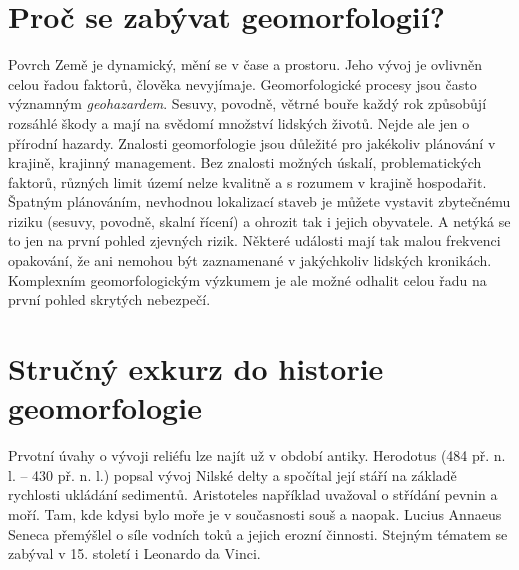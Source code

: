 \section{Proč se zabývat geomorfologií?}
Povrch Země je dynamický, mění se v čase a prostoru. Jeho vývoj je ovlivněn celou řadou faktorů, člověka nevyjímaje. Geomorfologické procesy jsou často významným \emph{geohazardem}. Sesuvy, povodně, větrné bouře každý rok způsobůjí rozsáhlé škody a mají na svědomí množství lidských životů. Nejde ale jen o přírodní hazardy. Znalosti geomorfologie jsou důležité pro jakékoliv plánování v krajině, krajinný management. Bez znalosti možných úskalí, problematických faktorů, různých limit území nelze kvalitně a s rozumem v krajině hospodařit. Špatným plánováním, nevhodnou lokalizací staveb je můžete vystavit zbytečnému riziku (sesuvy, povodně, skalní řícení) a ohrozit tak i jejich obyvatele. 
A netýká se to jen na první pohled zjevných rizik. Některé události mají tak malou frekvenci opakování, že ani nemohou být zaznamenané v jakýchkoliv lidských kronikách. Komplexním geomorfologickým výzkumem je ale možné odhalit celou řadu na první pohled skrytých nebezpečí.

\section{Stručný exkurz do historie geomorfologie}
Prvotní úvahy o vývoji reliéfu lze najít už v období antiky. Herodotus (484 př. n. l. -- 430 př. n. l.) popsal vývoj Nilské delty a spočítal její stáří na základě rychlosti ukládání sedimentů. Aristoteles například uvažoval o střídání pevnin a moří. Tam, kde kdysi bylo moře je v současnosti souš a naopak. Lucius Annaeus Seneca přemýšlel o síle vodních toků a jejich erozní činnosti. Stejným tématem se zabýval v 15. století i Leonardo da Vinci.

